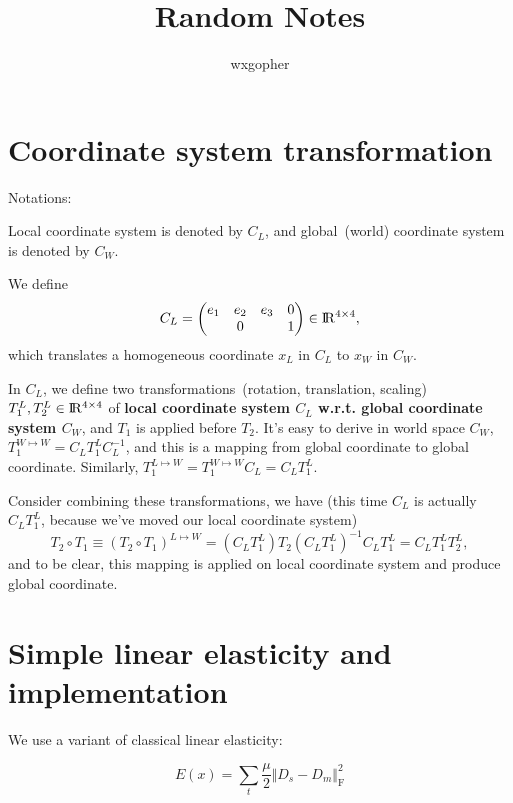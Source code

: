 \documentclass{fancydoc}
\newcommand{\realR}{\rm I\!R}
\begin{document}
\title{Random Notes}
\author{wxgopher}

\maketitle
\tableofcontents
\newpage

\dotfill


\section{Coordinate system transformation}
Notations:

Local coordinate system is denoted by $C_L$, and global~(world) coordinate system is denoted by $C_W$.

We define 
\begin{equation}
C_L = \begin{pmatrix}
e_1 & e_2 & e_3 & 0 \\
    &  0  &    & 1
\end{pmatrix} \in \realR^{4\times 4},
\end{equation}
which translates a homogeneous coordinate $x_L$ in $C_L$ to $x_W$ in $C_W$.

In $C_L$, we define two transformations~(rotation, translation, scaling) $T_1^L,T_2^L\in \realR^{4\times 4}$ of {\bf local coordinate system $C_L$ w.r.t. global coordinate system $C_W$}, and $T_1$ is applied before $T_2$. It's easy to derive in world space $C_W$, $T_1^{W\mapsto W} = C_L T_1^L C_L^{-1}$, and this is a mapping from global coordinate to global coordinate. Similarly, $T_1^{L\mapsto W} = T_1^{W\mapsto W} C_L = C_L T_1^L$.

Consider combining these transformations, we have (this time $C_L$ is actually $C_LT_1^L$, because we've moved our local coordinate system)
\begin{equation}
T_2\circ T_1 \equiv (T_2\circ T_1)^{L\mapsto W} = (C_L T_1^L) T_2 (C_L T_1^L)^{-1} C_L T_1^L = C_L T_1^L T_2^L,
\end{equation}
and to be clear, this mapping is applied on local coordinate system and produce global coordinate.


\section{Simple linear elasticity and implementation}
We use a variant of classical linear elasticity:

\begin{equation}
E(x) = \sum_t\frac{\mu}{2} \Vert D_s - D_m \Vert^2_\mathrm{F}
\end{equation}
\end{document}

